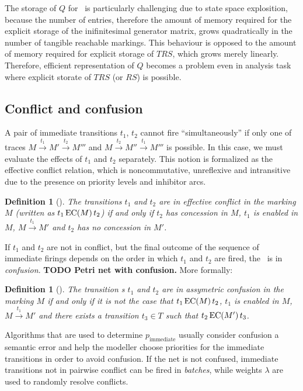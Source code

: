 \documentclass[a4paper,11pt,twoside,openright]{memoir}
\newcommand*{\EffC}[1]{\mathop{\textnormal{EC}\mathnormal{(#1)}}}
\newcommand*{\RS}{\textit{RS}}
\newcommand*{\TRS}{\textit{TRS}}
\newcommand*{\textabbrev}[1]{\textls[50]{\textsc{#1}}}
\newcommand*{\gspn}{\textabbrev{gspn}}
\newcommand{\paren}[1]{\textup(#1\textup)}
\theoremstyle{my}
\newtheorem{dfn}[thm]{Definition}
\begin{document}
The storage of $Q$ for \gspn\ is particularly challenging due to state
space explosition, because the number of entries, therefore the amount
of memory required for the explicit storage of the inifinitesimal
generator matrix, grows quadratically in the number of tangible
reachable markings. This behaviour is opposed to the amount of memory
required for explicit storage of $\TRS$, which grows merely
linearly. Therefore, efficient representation of $Q$ becomes a problem
even in analysis task where explicit storate of $\TRS$ (or $\RS$) is
possible.

\subsection{Conflict and confusion}

A pair of immediate transitions $t_1$, $t_2$ cannot fire
``simultaneously'' if only one of traces
$M \xrightarrow{t_1} M' \xrightarrow{t_2} M'''$ and
$M \xrightarrow{t_2} M'' \xrightarrow{t_1} M'''$ is possible. In this
case, we must evaluate the effects of $t_1$ and $t_2$ separately. This
notion is formalized as the effective conflict relation, which is
noncommutative, unreflexive and intransitive due to the presence on
priority levels and inhibitor arcs.

\begin{dfn}[\cite{DBLP:journals/tse/ChiolaMBC93}]
  The transitions $t_1$ and $t_2$ are in \emph{effective conflict} in
  the marking $M$ \paren{written as $t_1 \EffC{M} t_2$} if and only if
  $t_2$ has concession in $M$, $t_1$ is enabled in $M$, $M
  \xrightarrow{t_1} M'$ and $t_2$ has no concession in $M'$.
\end{dfn}

If $t_1$ and $t_2$ are not in conflict, but the final outcome of the
sequence of immediate firings depends on the order in which $t_1$ and
$t_2$ are fired, the \gspn\ is in \emph{confusion}. \textbf{TODO Petri
  net with confusion.} More formally:

\begin{dfn}[\cite{DBLP:journals/tse/ChiolaMBC93}]
  The transition s $t_1$ and $t_2$ are in \emph{assymetric confusion}
  in the marking $M$ if and only if it is \emph{not} the case that
  $t_1 \EffC{M} t_2$, $t_1$ is enabled in $M$,
  $M \xrightarrow{t_1} M'$ and there exists a transition $t_3 \in T$
  such that $t_2 \EffC{M'} t_3$.
\end{dfn}

Algorithms that are used to determine $p_{\text{immediate}}$
\citep{DBLP:journals/tse/ChiolaMBC93, DBLP:journals/tse/TeruelFP03}
usually consider confusion a semantic error and help the modeller
choose priorities for the immediate transitions in order to avoid
confusion. If the net is not confused, immediate transitions not in
pairwise conflict can be fired in \emph{batches}, while weights
$\lambda$ are used to randomly resolve conflicts.
\end{document}

